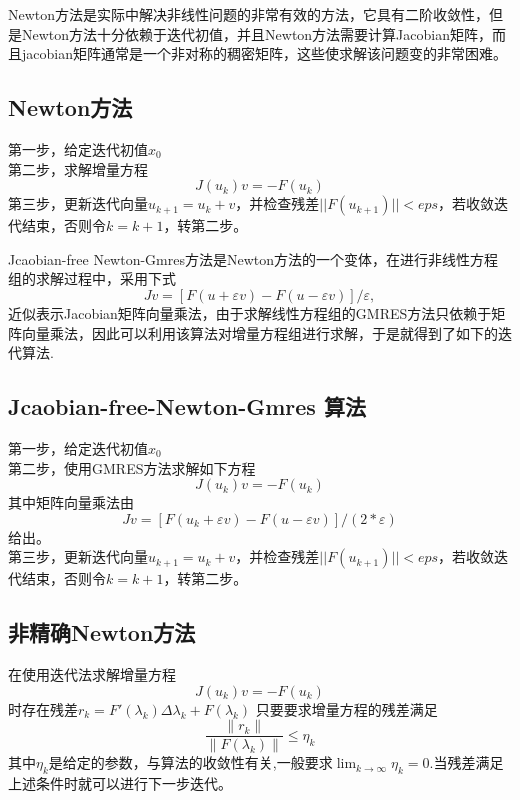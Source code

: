 Newton方法是实际中解决非线性问题的非常有效的方法，它具有二阶收敛性，但是Newton方法十分依赖于迭代初值，并且Newton方法需要计算Jacobian矩阵，而且jacobian矩阵通常是一个非对称的稠密矩阵，这些使求解该问题变的非常困难。

\subsection{Newton方法}
第一步，给定迭代初值${x_0}$ \\
\indent
第二步，求解增量方程 \\
\begin{equation}
	J({u_k})v =  - F({u_k})
\end{equation}
\indent
第三步，更新迭代向量${u_{k + 1}} = {u_k} + v$，并检查残差$||F({u_{k + 1}})|| < eps$，若收敛迭代结束，否则令$k = k + 1$，转第二步。

Jcaobian-free Newton-Gmres方法是Newton方法的一个变体，在进行非线性方程组的求解过程中，采用下式
\begin{equation}
Jv = [F(u + \varepsilon v) - F(u - \varepsilon v)]/\varepsilon, 
\end{equation}
近似表示Jacobian矩阵向量乘法，由于求解线性方程组的GMRES方法只依赖于矩阵向量乘法，因此可以利用该算法对增量方程组进行求解，于是就得到了如下的迭代算法.
\subsection{Jcaobian-free-Newton-Gmres 算法}
第一步，给定迭代初值${x_0}$ \\
\indent
第二步，使用GMRES方法求解如下方程\\
\begin{equation}
	J({u_k})v =  - F({u_k})
\end{equation}
其中矩阵向量乘法由
\begin{equation}
Jv = [F({u_k} + \varepsilon v) - F(u - \varepsilon v)]/(2*\varepsilon )
\label{eq:jaco}
\end{equation}
给出。\\
\indent
第三步，更新迭代向量${u_{k + 1}} = {u_k} + v$，并检查残差$||F({u_{k + 1}})|| < eps$，若收敛迭代结束，否则令$k = k + 1$，转第二步。
\subsection{非精确Newton方法}
在使用迭代法求解增量方程
\begin{equation}
	J({u_k})v =  - F({u_k})
\end{equation}
时存在残差$r_k = F'(\lambda_k)\Delta\lambda_k + F(\lambda_k)$
只要要求增量方程的残差满足
\begin{equation}
	\frac{\| r_k\|}{\|F(\lambda_k)\|} \le \eta_k
\end{equation}
其中$\eta_k$是给定的参数，与算法的收敛性有关,一般要求$\lim_{k\rightarrow \infty}\eta_k = 0 $.当残差满足上述条件时就可以进行下一步迭代。

